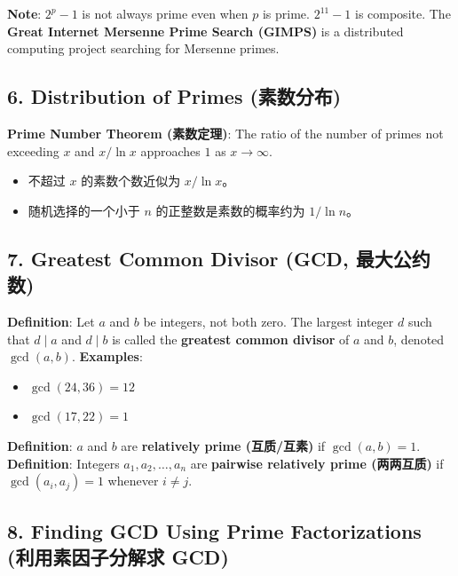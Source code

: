 \documentclass[10pt,a4paper,openany]{ctexbook}
\theoremstyle{definition}
\theoremstyle{remark}
\begin{document}
\textbf{Note}: $2^p - 1$ is not always prime even when $p$ is prime. $2^{11} - 1$ is composite.
The \textbf{Great Internet Mersenne Prime Search (GIMPS)} is a distributed computing project searching for Mersenne primes.
\vspace{-2pt}

\subsection{6. Distribution of Primes (素数分布)}

\textbf{Prime Number Theorem (素数定理)}: The ratio of the number of primes not exceeding $x$ and $x/\ln x$ approaches $1$ as $x \to \infty$.
\begin{itemize}
\item 不超过 $x$ 的素数个数近似为 $x / \ln x$。
\item 随机选择的一个小于 $n$ 的正整数是素数的概率约为 $1 / \ln n$。

\end{itemize}

\vspace{-2pt}

\subsection{7. Greatest Common Divisor (GCD, 最大公约数)}

\textbf{Definition}: Let $a$ and $b$ be integers, not both zero. The largest integer $d$ such that $d \mid a$ and $d \mid b$ is called the \textbf{greatest common divisor} of $a$ and $b$, denoted $\gcd(a, b)$.
\textbf{Examples}:
\begin{itemize}
\item $\gcd(24, 36) = 12$
\item $\gcd(17, 22) = 1$

\end{itemize}

\textbf{Definition}: $a$ and $b$ are \textbf{relatively prime (互质/互素)} if $\gcd(a, b) = 1$.
\textbf{Definition}: Integers $a_1, a_2, \dots, a_n$ are \textbf{pairwise relatively prime (两两互质)} if $\gcd(a_i, a_j) = 1$ whenever $i \neq j$.
\vspace{-2pt}

\subsection{8. Finding GCD Using Prime Factorizations (利用素因子分解求 GCD)}
\end{document}
